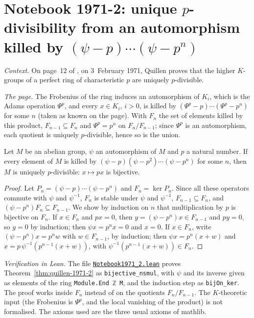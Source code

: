\section[Notebook 1971-2: unique $p$-divisibility from the Adams operation]{Notebook 1971-2: unique $p$-divisibility from an automorphism killed by $(\psi - p)\cdots(\psi - p^n)$\protect{}}\label{sec:quillen-1971-2}

\emph{Context.} On page~12 of , on 3~February 1971, Quillen proves that the higher $K$-groups of a perfect ring of characteristic $p$ are uniquely $p$-divisible.

\emph{The page.} The Frobenius of the ring induces an automorphism of $K_i$, which is the Adams operation $\Psi^p$, and every $x \in K_i$, $i > 0$, is killed by $(\Psi^p - p)\cdots(\Psi^p - p^n)$ for some $n$ (taken as known on the page). With $F_n$ the set of elements killed by this product, $F_{n-1} \subseteq F_n$ and $\Psi^p = p^n$ on $F_n/F_{n-1}$; since $\Psi^p$ is an automorphism, each quotient is uniquely $p$-divisible, hence so is the union.

\begin{encadre}
\begin{theoreme}\label{thm:quillen-1971-2}
Let $M$ be an abelian group, $\psi$ an automorphism of $M$ and $p$ a natural number. If every element of $M$ is killed by $(\psi - p)(\psi - p^2)\cdots(\psi - p^n)$ for some $n$, then $M$ is uniquely $p$-divisible: $x \mapsto px$ is bijective.
\end{theoreme}
\end{encadre}

\begin{proof}
Let $P_n = (\psi - p)\cdots(\psi - p^n)$ and $F_n = \ker P_n$. Since all these operators commute with $\psi$ and $\psi^{-1}$, $F_n$ is stable under $\psi$ and $\psi^{-1}$, $F_{n-1} \subseteq F_n$, and $(\psi - p^n)F_n \subseteq F_{n-1}$. We show by induction on $n$ that multiplication by $p$ is bijective on $F_n$. If $x \in F_n$ and $px = 0$, then $y = (\psi - p^n)x \in F_{n-1}$ and $py = 0$, so $y = 0$ by induction; then $\psi x = p^nx = 0$ and $x = 0$. If $x \in F_n$, write $(\psi - p^n)x = p^n w$ with $w \in F_{n-1}$, by induction; then $\psi x = p^n(x + w)$ and $x = p\,\psi^{-1}(p^{n-1}(x + w))$, with $\psi^{-1}(p^{n-1}(x+w)) \in F_n$.
\end{proof}

\emph{Verification in Lean.} The file \href{\leanblobmain/Notebook1971_2.lean}{\texttt{Notebook1971\_2.\allowbreak{}lean}} proves Theorem~\ref{thm:quillen-1971-2} as \texttt{bijective\_nsmul}, with $\psi$ and its inverse given as elements of the ring \texttt{Module.End ℤ M}, and the induction step as \texttt{bijOn\_ker}. The proof works inside $F_n$ instead of on the quotients $F_n/F_{n-1}$. The $K$-theoretic input (the Frobenius is $\Psi^p$, and the local vanishing of the product) is not formalised. The axioms used are the three usual axioms of mathlib.

